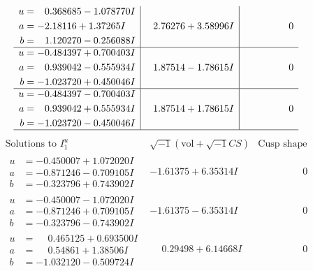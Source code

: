 \documentclass[1p]{elsarticle_modified}
\theoremstyle{definition}
\newcommand{\I}{\sqrt{-1}}
\begin{document}
$$\begin{array}{c|c|c}
\begin{aligned}
u &= \phantom{-}0.368685 - 1.078770 I \\
a &= -2.18116 + 1.37265 I \\
b &= \phantom{-}1.120270 - 0.256088 I\end{aligned}
 & \phantom{-}2.76276 + 3.58996 I & \phantom{-0.000000 } 0 \\ \hline\begin{aligned}
u &= -0.484397 + 0.700403 I \\
a &= \phantom{-}0.939042 - 0.555934 I \\
b &= -1.023720 + 0.450046 I\end{aligned}
 & \phantom{-}1.87514 - 1.78615 I & \phantom{-0.000000 } 0 \\ \hline\begin{aligned}
u &= -0.484397 - 0.700403 I \\
a &= \phantom{-}0.939042 + 0.555934 I \\
b &= -1.023720 - 0.450046 I\end{aligned}
 & \phantom{-}1.87514 + 1.78615 I & \phantom{-0.000000 } 0\\
 \hline 
 \end{array}$$\newpage$$\begin{array}{c|c|c}  
\text{Solutions to }I^u_{1}& \I (\text{vol} + \sqrt{-1}CS) & \text{Cusp shape}\\
 \hline 
\begin{aligned}
u &= -0.450007 + 1.072020 I \\
a &= -0.871246 - 0.709105 I \\
b &= -0.323796 + 0.743902 I\end{aligned}
 & -1.61375 + 6.35314 I & \phantom{-0.000000 } 0 \\ \hline\begin{aligned}
u &= -0.450007 - 1.072020 I \\
a &= -0.871246 + 0.709105 I \\
b &= -0.323796 - 0.743902 I\end{aligned}
 & -1.61375 - 6.35314 I & \phantom{-0.000000 } 0 \\ \hline\begin{aligned}
u &= \phantom{-}0.465125 + 0.693500 I \\
a &= \phantom{-}0.54861 + 1.38506 I \\
b &= -1.032120 - 0.509724 I\end{aligned}
 & \phantom{-}0.29498 + 6.14668 I & \phantom{-0.000000 } 0 \\ \hline\begin{aligned}

\end{aligned}
\end{array}$$
\end{document}
